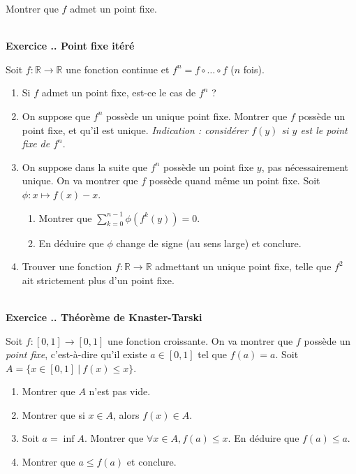 \documentclass{article}
\newcommand{\mb}[1]{\mathbb{#1}}
\newcounter{exo}
\newcommand{\exercice}[1][\null]{\textbf{\\ Exercice \thesection.\theexo. #1} \addtocounter{exo}{1}}
\begin{document}
Montrer que $f$ admet un point fixe.

\exercice[Point fixe itéré]

Soit $f : \mb{R} \rightarrow \mb{R}$ une fonction continue et $f^n = f \circ \dots \circ f$ ($n$ fois).
\begin{enumerate}

\item Si $f$ admet un point fixe, est-ce le cas de $f^n$ ?

\item On suppose que $f^n$ possède un unique point fixe. Montrer que $f$ possède un point fixe, et qu'il est unique. \emph{Indication : considérer $f(y)$ si $y$ est le point fixe de $f^n$}.

\item On suppose dans la suite que $f^n$ possède un point fixe $y$, pas nécessairement unique. On va montrer que $f$ possède quand même un point fixe. Soit $\phi : x \mapsto f(x) -x$.

\begin{enumerate}

\item Montrer que $\displaystyle \sum_{k=0}^{n-1} \phi(f^k(y)) = 0$.

\item En déduire que $\phi$ change de signe (au sens large) et conclure.

\end{enumerate}

\item Trouver une fonction $f : \mb{R} \rightarrow \mb{R}$ admettant un unique point fixe, telle que $f^2$ ait strictement plus d'un point fixe.


\end{enumerate}


\exercice[Théorème de Knaster-Tarski]

Soit $f : [0,1] \rightarrow [0,1]$ une fonction croissante. On va montrer que $f$ possède un \emph{point fixe}, c'est-à-dire qu'il existe $a \in [0,1]$ tel que $f(a) = a$. Soit $A = \{x \in [0,1]~|~f(x)\le x\}$.

\begin{enumerate}

\item Montrer que $A$ n'est pas vide.

\item Montrer que si $x \in A$, alors $f(x) \in A$.

\item Soit $a = \inf A$. Montrer que $\forall x \in A, f(a) \le x$. En déduire que $f(a)\le a$.

\item Montrer que $a \le f(a)$ et conclure.

\end{enumerate}
\end{document}
